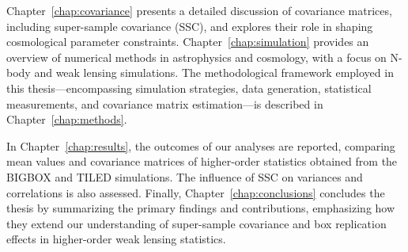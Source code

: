 Chapter~\ref{chap:covariance} presents a detailed discussion of covariance matrices, including super-sample covariance (SSC), and explores their role in shaping cosmological parameter constraints. Chapter~\ref{chap:simulation} provides an overview of numerical methods in astrophysics and cosmology, with a focus on N-body and weak lensing simulations. The methodological framework employed in this thesis—encompassing simulation strategies, data generation, statistical measurements, and covariance matrix estimation—is described in Chapter~\ref{chap:methods}.

In Chapter~\ref{chap:results}, the outcomes of our analyses are reported, comparing mean values and covariance matrices of higher-order statistics obtained from the BIGBOX and TILED simulations. The influence of SSC on variances and correlations is also assessed. Finally, Chapter~\ref{chap:conclusions} concludes the thesis by summarizing the primary findings and contributions, emphasizing how they extend our understanding of super-sample covariance and box replication effects in higher-order weak lensing statistics.